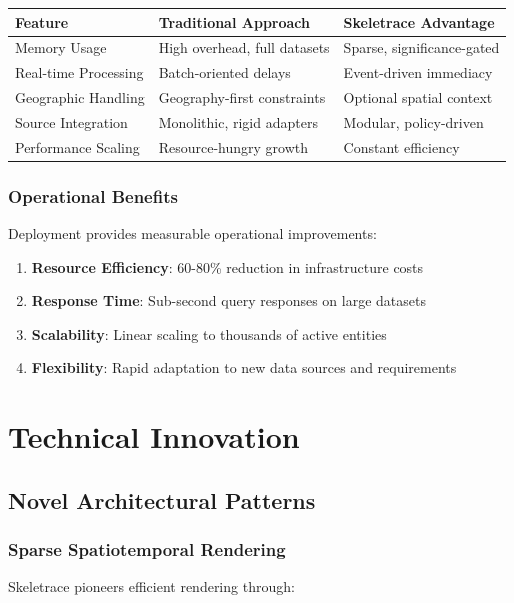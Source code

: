 \documentclass[12pt,a4paper]{article}
\begin{document}
\begin{longtable}{|p{4cm}|p{6cm}|p{5cm}|}
\hline
\textbf{Feature} & \textbf{Traditional Approach} & \textbf{Skeletrace Advantage} \\
\hline
\endhead
Memory Usage & High overhead, full datasets & Sparse, significance-gated \\
\hline
Real-time Processing & Batch-oriented delays & Event-driven immediacy \\
\hline
Geographic Handling & Geography-first constraints & Optional spatial context \\
\hline
Source Integration & Monolithic, rigid adapters & Modular, policy-driven \\
\hline
Performance Scaling & Resource-hungry growth & Constant efficiency \\
\hline
\end{longtable}

\subsubsection{Operational Benefits}
Deployment provides measurable operational improvements:

\begin{enumerate}
\item \textbf{Resource Efficiency}: 60-80\% reduction in infrastructure costs
\item \textbf{Response Time}: Sub-second query responses on large datasets
\item \textbf{Scalability}: Linear scaling to thousands of active entities
\item \textbf{Flexibility}: Rapid adaptation to new data sources and requirements
\end{enumerate}

\section{Technical Innovation}

\subsection{Novel Architectural Patterns}

\subsubsection{Sparse Spatiotemporal Rendering}
Skeletrace pioneers efficient rendering through:
\end{document}
